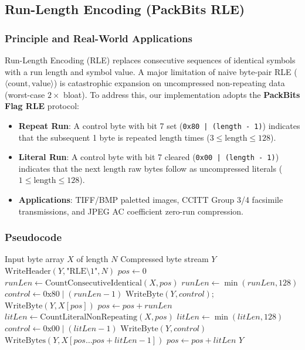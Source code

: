 \documentclass[12pt,a4paper]{article}
\begin{document}
\subsection{Run-Length Encoding (PackBits RLE)}

\subsubsection{Principle and Real-World Applications}
Run-Length Encoding (RLE) replaces consecutive sequences of identical symbols with a run length and symbol value. A major limitation of naive byte-pair RLE ($\langle\text{count}, \text{value}\rangle$) is catastrophic expansion on uncompressed non-repeating data (worst-case $2\times$ bloat). To address this, our implementation adopts the \textbf{PackBits Flag RLE} protocol:
\begin{itemize}
    \item \textbf{Repeat Run}: A control byte with bit 7 set (\texttt{0x80 | (length - 1)}) indicates that the subsequent 1 byte is repeated $\text{length}$ times ($3 \le \text{length} \le 128$).
    \item \textbf{Literal Run}: A control byte with bit 7 cleared (\texttt{0x00 | (length - 1)}) indicates that the next $\text{length}$ raw bytes follow as uncompressed literals ($1 \le \text{length} \le 128$).
    \item \textbf{Applications}: TIFF/BMP paletted images, CCITT Group 3/4 facsimile transmissions, and JPEG AC coefficient zero-run compression.
\end{itemize}

\subsubsection{Pseudocode}
\begin{algorithm}[H]
\caption{PackBits Flag RLE Compression}
\begin{algorithmic}[1]
\Require Input byte array $X$ of length $N$
\Ensure Compressed byte stream $Y$
\State $\text{WriteHeader}(Y, \text{"RLE\textbackslash 1"}, N)$
\State $pos \gets 0$
    \State $runLen \gets \text{CountConsecutiveIdentical}(X, pos)$
        \State $runLen \gets \min(runLen, 128)$
        \State $control \gets 0\text{x}80 \mid (runLen - 1)$ 
        \State $\text{WriteByte}(Y, control)$; $\text{WriteByte}(Y, X[pos])$
        \State $pos \gets pos + runLen$
    \Else
        \State $litLen \gets \text{CountLiteralNonRepeating}(X, pos)$
        \State $litLen \gets \min(litLen, 128)$
        \State $control \gets 0\text{x}00 \mid (litLen - 1)$ 
        \State $\text{WriteByte}(Y, control)$
        \State $\text{WriteBytes}(Y, X[pos \dots pos+litLen-1])$
        \State $pos \gets pos + litLen$
    \EndIf
\EndWhile
\State \Return $Y$
\end{algorithmic}
\end{algorithm}
\end{document}

